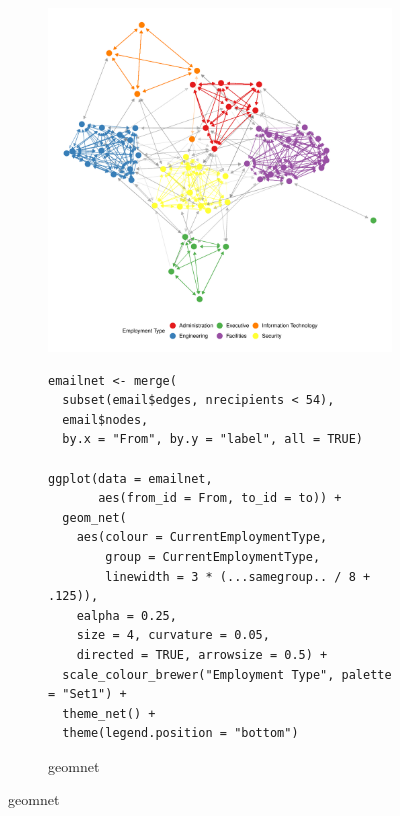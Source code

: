 \begin{figure}[hbt]
\begin{subfigure}[t]{\textwidth}
\begin{adjustbox}{valign=t}
\begin{minipage}{.49\textwidth}
\includegraphics[width=\textwidth]{figure/email_ggnet2-1.pdf}

                          \end{minipage}

                          \end{adjustbox}

\end{subfigure}
%
\begin{subfigure}[t]{\textwidth}
\caption{geomnet}
\vspace{1em}

             \begin{adjustbox}{valign=t}

             \begin{minipage}{.49\textwidth}
 \begin{knitrout}\footnotesize
{}\color{fgcolor}\begin{kframe}
\begin{verbatim}
emailnet <- merge(
  subset(email$edges, nrecipients < 54),
  email$nodes,
  by.x = "From", by.y = "label", all = TRUE)

ggplot(data = emailnet,
       aes(from_id = From, to_id = to)) +
  geom_net(
    aes(colour = CurrentEmploymentType,
        group = CurrentEmploymentType,
        linewidth = 3 * (...samegroup.. / 8 + .125)),
    ealpha = 0.25,
    size = 4, curvature = 0.05,
    directed = TRUE, arrowsize = 0.5) +
  scale_colour_brewer("Employment Type", palette = "Set1") +
  theme_net() +
  theme(legend.position = "bottom")
\end{verbatim}
\end{kframe}
\end{knitrout} \vspace{1em}


\end{minipage}
\end{adjustbox}
\end{subfigure}
\end{figure}
